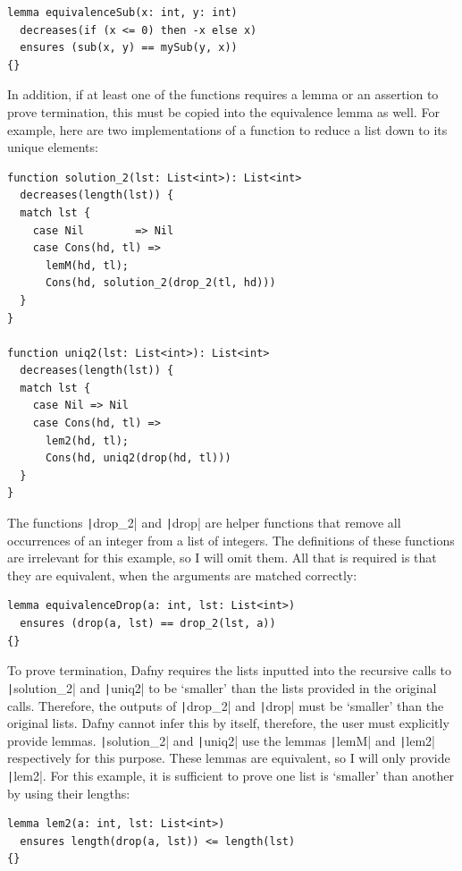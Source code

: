 \begin{verbatim}
lemma equivalenceSub(x: int, y: int)
  decreases(if (x <= 0) then -x else x)
  ensures (sub(x, y) == mySub(y, x))
{}
\end{verbatim}
%
In addition, if at least one of the functions requires a lemma or an assertion to prove termination, this must be copied into the equivalence lemma as well. For example, here are two implementations of a function to reduce a list down to its unique elements:
\begin{verbatim}
function solution_2(lst: List<int>): List<int>
  decreases(length(lst)) {
  match lst {
    case Nil        => Nil
    case Cons(hd, tl) =>
      lemM(hd, tl);
      Cons(hd, solution_2(drop_2(tl, hd)))
  }
}

function uniq2(lst: List<int>): List<int>
  decreases(length(lst)) {
  match lst {
    case Nil => Nil
    case Cons(hd, tl) =>
      lem2(hd, tl);
      Cons(hd, uniq2(drop(hd, tl)))
  }
}
\end{verbatim}
%
The functions \texttt|drop_2| and \texttt|drop| are helper functions that remove all occurrences of an integer from a list of integers. The definitions of these functions are irrelevant for this example, so I will omit them. All that is required is that they are equivalent, when the arguments are matched correctly:
\begin{verbatim}
lemma equivalenceDrop(a: int, lst: List<int>)
  ensures (drop(a, lst) == drop_2(lst, a))
{}
\end{verbatim}
%
To prove termination, Dafny requires the lists inputted into the recursive calls to \texttt|solution_2| and \texttt|uniq2| to be `smaller' than the lists provided in the original calls. Therefore, the outputs of \texttt|drop_2| and \texttt|drop| must be `smaller' than the original lists. Dafny cannot infer this by itself, therefore, the user must explicitly provide lemmas. \texttt|solution_2| and \texttt|uniq2| use the lemmas \texttt|lemM| and \texttt|lem2| respectively for this purpose. These lemmas are equivalent, so I will only provide \texttt|lem2|. For this example, it is sufficient to prove one list is `smaller' than another by using their lengths:
\begin{verbatim}
lemma lem2(a: int, lst: List<int>)
  ensures length(drop(a, lst)) <= length(lst)
{}
\end{verbatim}
